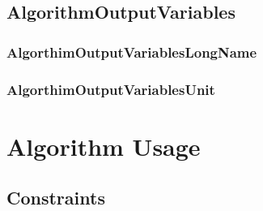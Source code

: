 \documentclass[12pt]{article}
\begin{document}
\subsection{AlgorithmOutputVariables}
\AlgorithmOutputVariables

\subsubsection{AlgorthimOutputVariablesLongName}
\AlgorthimOutputVariablesLongName

\subsubsection{AlgorthimOutputVariablesUnit}
\AlgorthimOutputVariablesUnit

\section{Algorithm Usage}
\AlgorithmUsage

\subsection{Constraints}
\Constraints



\end{document}
